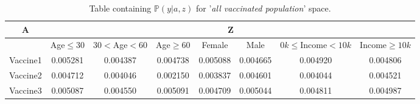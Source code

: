 \documentclass{article}
\begin{document}


\begin{center}
\begin{table}[H]
\begin{adjustbox}{max width=\textwidth}
    \begin{tabular}{ |c| c c c c c c c|}
        \hline
          A  & \multicolumn{7}{c|}{Z} \\
          \hline
          & Age$\leq30$ &    $30<$Age$<60$ &     Age$\geq60$ &    Female &      Male &   $0k\leq$Income$<10k$ &    Income$\geq10k$  \\
        \hline
        Vaccine1 &  0.005281 &  0.004387 &  0.004738 &  0.005088 &  0.004665 &  0.004920 &  0.004806 \\
        Vaccine2 &  0.004712 &  0.004046 &  0.002150 &  0.003837 &  0.004601 &  0.004044 &  0.004521 \\
        Vaccine3 &  0.005087 &  0.004550 &  0.005091 &  0.004709 &  0.005044 &  0.004811 &  0.004987
         \\ \hline
    \end{tabular}
    \end{adjustbox}
    \caption{Table containing $\mathbb{P}(y | a, z)$ for '\textit{all vaccinated population}' space.}
    \label{tab:6}
\end{table}
\end{center}
\end{document}
